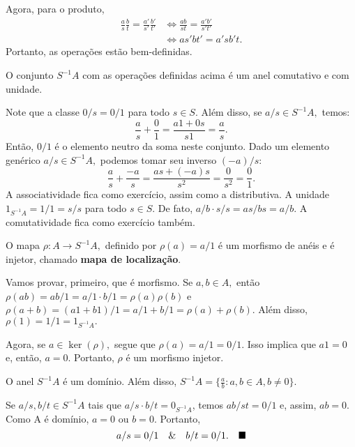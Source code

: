 \documentclass[AlgebraII/algebraII_notes.tex]{subfiles}
\begin{document}
Agora, para o produto,
\begin{align*}
	\frac{a}{s}\frac{b}{t} = \frac{a'}{s'}\frac{b'}{t'} & \Longleftrightarrow \frac{ab}{st}=\frac{a'b'}{s't'} \\
	                                                    & \Longleftrightarrow as'bt' = a'sb't.
\end{align*}
Portanto, as operações estão bem-definidas.
\begin{prop*}
	O conjunto \(S^{-1}A\) com as operações definidas acima é um anel comutativo e com unidade.
\end{prop*}
\begin{proof*}
	Note que a classe \(0/s = 0/1\) para todo \(s\in S\). Além disso, se \(a/s\in S^{-1}A,\) temos:
	\[
		\frac{a}{s}+\frac{0}{1} = \frac{a1 + 0s}{s1} = \frac{a}{s}.
	\]
	Então, \(0/1\) é o elemento neutro da soma neste conjunto. Dado um elemento genérico \(a/s\in S^{-1}A,\) podemos tomar seu inverso \((-a)/s:\)
	\[
		\frac{a}{s}+\frac{-a}{s} = \frac{as + (-a)s}{s^{2}} = \frac{0}{s^{2}} = \frac{0}{1}.
	\]
	A associatividade fica como exercício, assim como a distributiva. A unidade \(1_{S^{-1}A} = 1/1 = s/s \) para todo \(s\in S\). De fato,
	\(a/b \cdot s/s = as/bs = a/b\). A comutatividade fica como exercício também. \qedsymbol
\end{proof*}
\begin{lemma*}
	O mapa \(\rho :A\rightarrow S^{-1}A,\) definido por \(\rho (a) = a/1\) é um morfismo de anéis e é injetor, chamado \textbf{mapa de localização}.
\end{lemma*}
\begin{proof*}
	Vamos provar, primeiro, que é morfismo. Se \(a, b\in A,\) então \(\rho (ab) = ab/1 = a/1 \cdot b/1 = \rho (a)\rho (b)\) e \(\rho (a+b) = (a1+b1)/1 = a/1 + b/1 = \rho (a) + \rho (b).\)
	Além disso, \(\rho (1) = 1/1 = 1_{S^{-1}A}.\)

	Agora, se \(a\in\ker{(\rho )},\) segue que \(\rho (a) = a/1 = 0/1.\) Isso implica que \(a1 = 0\) e, então, \(a = 0.\) Portanto,
	\(\rho \) é um morfismo injetor. \qedsymbol
\end{proof*}
\begin{prop*}
	O anel \(S^{-1}A\) é um domínio. Além disso, \(S^{-1}A = \biggl\{\frac{a}{b}: a, b\in A, b\neq 0\biggr\}\).
\end{prop*}
\begin{proof*}
	Se \(a/s, b/t\in S^{-1}A\) tais que \(a/s \cdot b/t = 0_{S^{-1}A}\), temos \(ab/st = 0/1\) e, assim,
	\(ab = 0.\) Como A é domínio, \(a = 0\) ou \(b = 0\). Portanto,
	\[
		a/s = 0/1\quad\&\quad b/t = 0/1.\quad \text{$\blacksquare$}
	\]
\end{proof*}
\end{document}
